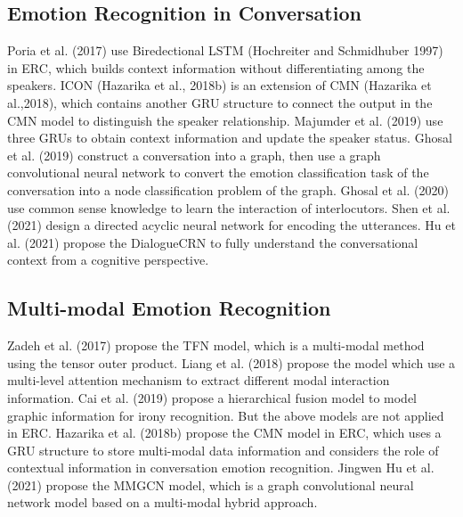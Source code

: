 \subsection{Emotion Recognition in Conversation}
Poria et al. (2017) use Biredectional LSTM (Hochreiter and Schmidhuber 1997) in ERC, which builds context information without differentiating among the speakers. ICON (Hazarika et al., 2018b) is an extension of CMN (Hazarika et al.,2018), which contains another GRU structure to connect the output in the CMN model to distinguish the speaker relationship. Majumder et al. (2019) use three GRUs to obtain context information and update the speaker status. Ghosal et al. (2019) construct a conversation into a graph, then use a graph convolutional neural network to convert the emotion classification task of the conversation into a node classification problem of the graph. Ghosal et al. (2020) use common sense knowledge to learn the interaction of interlocutors. Shen et al. (2021) design a directed acyclic neural network for encoding the utterances. Hu et al. (2021) propose the DialogueCRN to fully understand the conversational context from a cognitive perspective. 
\subsection{Multi-modal Emotion Recognition}
Zadeh et al. (2017) propose the TFN model, which is a multi-modal method using the tensor outer product. Liang et al. (2018) propose the model which use a multi-level attention mechanism to extract different modal interaction information. Cai et al. (2019) propose a hierarchical fusion model to model graphic information for irony recognition. But the above models are not applied in ERC. Hazarika et al. (2018b) propose the CMN model in ERC, which uses a GRU structure to store multi-modal data information and considers the role of contextual information in conversation emotion recognition. Jingwen Hu et al. (2021) propose the MMGCN model, which is a graph convolutional neural network model based on a multi-modal hybrid approach. 
